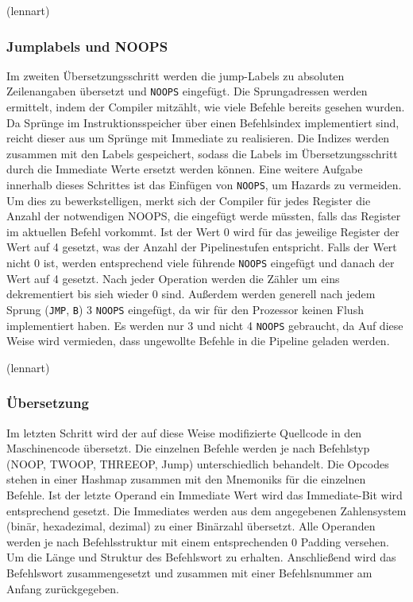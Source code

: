 \documentclass[paper=a4,fontsize=12pt,twocolumn]{scrreprt}
\begin{document}
(lennart)

\subsubsection{Jumplabels und NOOPS}
Im zweiten Übersetzungsschritt werden die jump-Labels zu absoluten Zeilenangaben übersetzt und \texttt{NOOPS} eingefügt.
Die Sprungadressen werden ermittelt, indem der Compiler mitzählt, wie viele Befehle bereits gesehen wurden.
Da Sprünge im Instruktionsspeicher über einen Befehlsindex implementiert sind, reicht dieser aus um Sprünge mit Immediate zu realisieren.
Die Indizes werden zusammen mit den Labels gespeichert, sodass die Labels im Übersetzungsschritt durch die Immediate Werte ersetzt werden können.
Eine weitere Aufgabe innerhalb dieses Schrittes ist das Einfügen von \texttt{NOOPS}, um Hazards zu vermeiden.
Um dies zu bewerkstelligen, merkt sich der Compiler für jedes Register die Anzahl der notwendigen NOOPS, die eingefügt werde müssten, falls das Register im aktuellen Befehl vorkommt.
Ist der Wert 0 wird für das jeweilige Register der Wert auf 4 gesetzt, was der Anzahl der Pipelinestufen entspricht.
Falls der Wert nicht 0 ist, werden entsprechend viele führende \texttt{NOOPS} eingefügt und danach der Wert auf 4 gesetzt. 
Nach jeder Operation werden die Zähler um eins dekrementiert bis sieh wieder 0 sind.
Außerdem werden generell nach jedem Sprung (\texttt{JMP}, \texttt{B}) 3 \texttt{NOOPS} eingefügt, da wir für den Prozessor keinen Flush implementiert haben. Es werden nur 3 und nicht 4 \texttt{NOOPS} gebraucht, da 
Auf diese Weise wird vermieden, dass ungewollte Befehle in die Pipeline geladen werden.

(lennart)

\subsubsection{Übersetzung}
Im letzten Schritt wird der auf diese Weise modifizierte Quellcode in den Maschinencode übersetzt.
Die einzelnen Befehle werden je nach Befehlstyp (NOOP, TWOOP, THREEOP, Jump) unterschiedlich behandelt.
Die Opcodes stehen in einer Hashmap zusammen mit den Mnemoniks für die einzelnen Befehle.
Ist der letzte Operand ein Immediate Wert wird das Immediate-Bit wird entsprechend gesetzt.
Die Immediates werden aus dem angegebenen Zahlensystem (binär, hexadezimal, dezimal) zu einer Binärzahl übersetzt.
Alle Operanden werden je nach Befehlsstruktur mit einem entsprechenden 0 Padding versehen. Um die Länge und Struktur des Befehlswort zu erhalten.
Anschließend wird das Befehlswort zusammengesetzt und zusammen mit einer Befehlsnummer am Anfang zurückgegeben.
\end{document}
